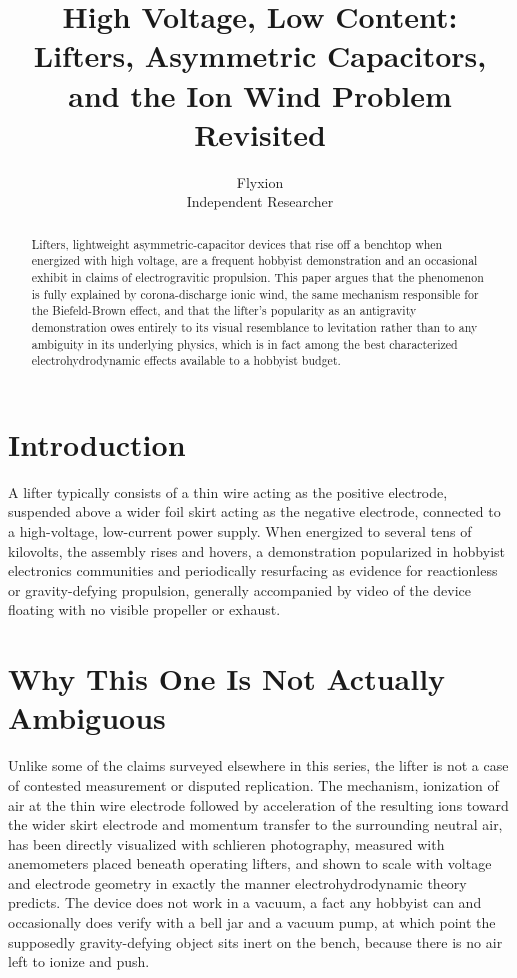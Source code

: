 \documentclass[11pt]{article}
\title{High Voltage, Low Content: Lifters, Asymmetric Capacitors, and the Ion Wind Problem Revisited}
\author{Flyxion \\ \small Independent Researcher}
\date{}
\begin{document}
\maketitle

\begin{abstract}
Lifters, lightweight asymmetric-capacitor devices that rise off a benchtop when energized with high voltage, are a frequent hobbyist demonstration and an occasional exhibit in claims of electrogravitic propulsion. This paper argues that the phenomenon is fully explained by corona-discharge ionic wind, the same mechanism responsible for the Biefeld-Brown effect, and that the lifter's popularity as an antigravity demonstration owes entirely to its visual resemblance to levitation rather than to any ambiguity in its underlying physics, which is in fact among the best characterized electrohydrodynamic effects available to a hobbyist budget.
\end{abstract}

\section{Introduction}

A lifter typically consists of a thin wire acting as the positive electrode, suspended above a wider foil skirt acting as the negative electrode, connected to a high-voltage, low-current power supply. When energized to several tens of kilovolts, the assembly rises and hovers, a demonstration popularized in hobbyist electronics communities and periodically resurfacing as evidence for reactionless or gravity-defying propulsion, generally accompanied by video of the device floating with no visible propeller or exhaust.

\section{Why This One Is Not Actually Ambiguous}

Unlike some of the claims surveyed elsewhere in this series, the lifter is not a case of contested measurement or disputed replication. The mechanism, ionization of air at the thin wire electrode followed by acceleration of the resulting ions toward the wider skirt electrode and momentum transfer to the surrounding neutral air, has been directly visualized with schlieren photography, measured with anemometers placed beneath operating lifters, and shown to scale with voltage and electrode geometry in exactly the manner electrohydrodynamic theory predicts. The device does not work in a vacuum, a fact any hobbyist can and occasionally does verify with a bell jar and a vacuum pump, at which point the supposedly gravity-defying object sits inert on the bench, because there is no air left to ionize and push.
\end{document}

